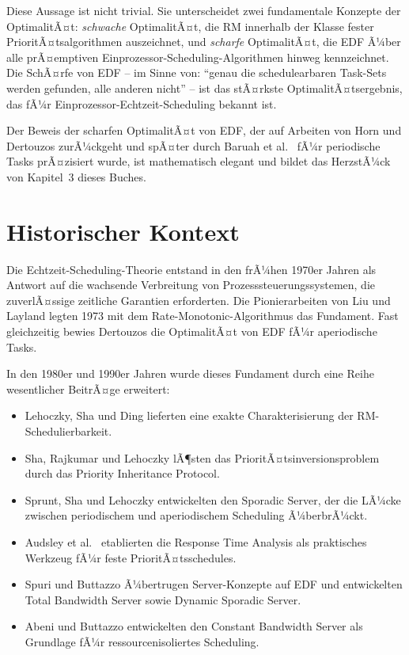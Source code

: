 ﻿\documentclass[a4paper,12pt]{report}
\theoremstyle{definition}
\begin{document}
Diese Aussage ist nicht trivial. Sie unterscheidet zwei fundamentale Konzepte
der OptimalitÃ¤t: \emph{schwache} OptimalitÃ¤t, die RM innerhalb der Klasse
fester PrioritÃ¤tsalgorithmen auszeichnet, und \emph{scharfe} OptimalitÃ¤t,
die EDF Ã¼ber alle prÃ¤emptiven Einprozessor-Scheduling-Algorithmen hinweg
kennzeichnet. Die SchÃ¤rfe von EDF -- im Sinne von: ``genau die schedulearbaren
Task-Sets werden gefunden, alle anderen nicht'' -- ist das stÃ¤rkste
OptimalitÃ¤tsergebnis, das fÃ¼r Einprozessor-Echtzeit-Scheduling bekannt ist.

Der Beweis der scharfen OptimalitÃ¤t von EDF, der auf Arbeiten von Horn
\cite{Horn1974} und Dertouzos \cite{Dertouzos1974} zurÃ¼ckgeht und spÃ¤ter
durch Baruah et al.\ \cite{Baruah1990} fÃ¼r periodische Tasks prÃ¤zisiert wurde,
ist mathematisch elegant und bildet das HerzstÃ¼ck von Kapitel~3 dieses Buches.

\section*{Historischer Kontext}

Die Echtzeit-Scheduling-Theorie entstand in den frÃ¼hen 1970er Jahren als
Antwort auf die wachsende Verbreitung von Prozesssteuerungssystemen, die
zuverlÃ¤ssige zeitliche Garantien erforderten. Die Pionierarbeiten von Liu und
Layland \cite{Liu1973} legten 1973 mit dem Rate-Monotonic-Algorithmus das
Fundament. Fast gleichzeitig bewies Dertouzos \cite{Dertouzos1974} die
OptimalitÃ¤t von EDF fÃ¼r aperiodische Tasks.

In den 1980er und 1990er Jahren wurde dieses Fundament durch eine Reihe
wesentlicher BeitrÃ¤ge erweitert:
\begin{itemize}
	\item Lehoczky, Sha und Ding \cite{Lehoczky1989} lieferten eine exakte
	      Charakterisierung der RM-Schedulierbarkeit.
	\item Sha, Rajkumar und Lehoczky \cite{Sha1990} lÃ¶sten das PrioritÃ¤tsinversionsproblem
	      durch das Priority Inheritance Protocol.
	\item Sprunt, Sha und Lehoczky \cite{Sprunt1989} entwickelten den Sporadic Server,
	      der die LÃ¼cke zwischen periodischem und aperiodischem Scheduling Ã¼berbrÃ¼ckt.
	\item Audsley et al.\ \cite{Audsley1993} etablierten die Response Time Analysis
	      als praktisches Werkzeug fÃ¼r feste PrioritÃ¤tsschedules.
	\item Spuri und Buttazzo \cite{Spuri1996} Ã¼bertrugen Server-Konzepte auf
	      EDF und entwickelten Total Bandwidth Server sowie Dynamic Sporadic Server.
	\item Abeni und Buttazzo \cite{Abeni1998} entwickelten den Constant Bandwidth
	      Server als Grundlage fÃ¼r ressourcenisoliertes Scheduling.
\end{itemize}
\end{document}

